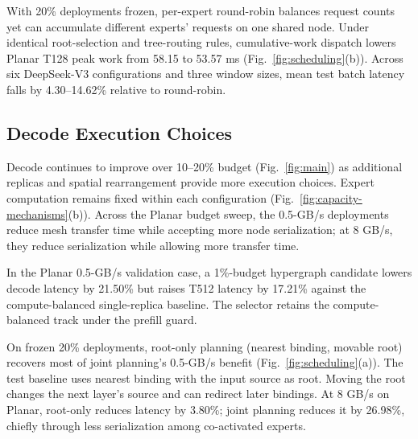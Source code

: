 With 20\% deployments frozen, per-expert round-robin balances request counts yet can accumulate different experts' requests on one shared node. Under identical root-selection and tree-routing rules, cumulative-work dispatch lowers Planar T128 peak work from 58.15 to 53.57 ms (Fig.~\ref{fig:scheduling}(b)). Across six DeepSeek-V3 configurations and three window sizes, mean test batch latency falls by 4.30--14.62\% relative to round-robin.

\subsection{Decode Execution Choices}

Decode continues to improve over 10--20\% budget (Fig.~\ref{fig:main}) as additional replicas and spatial rearrangement provide more execution choices. Expert computation remains fixed within each configuration (Fig.~\ref{fig:capacity-mechanisms}(b)). Across the Planar budget sweep, the 0.5-GB/s deployments reduce mesh transfer time while accepting more node serialization; at 8 GB/s, they reduce serialization while allowing more transfer time.

In the Planar 0.5-GB/s validation case, a 1\%-budget hypergraph candidate lowers decode latency by 21.50\% but raises T512 latency by 17.21\% against the compute-balanced single-replica baseline. The selector retains the compute-balanced track under the prefill guard.

On frozen 20\% deployments, root-only planning (nearest binding, movable root) recovers most of joint planning's 0.5-GB/s benefit (Fig.~\ref{fig:scheduling}(a)). The test baseline uses nearest binding with the input source as root. Moving the root changes the next layer's source and can redirect later bindings. At 8 GB/s on Planar, root-only reduces latency by 3.80\%; joint planning reduces it by 26.98\%, chiefly through less serialization among co-activated experts.
